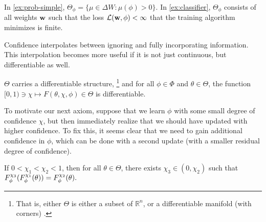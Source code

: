 In \cref{ex:prob-simple}, $\Theta_\phi = \{ \mu \in \Delta W : \mu(\phi) > 0\}$.
In \cref{ex:classifier}, $\Theta_\phi$ consists of all weights $\mathbf{w}$ 
such that
the loss $\mathcal L(\mathbf{w}, \phi) < \infty$ that the training algorithm minimizes is finite.



Confidence interpolates between ignoring and fully incorporating 
information. This interpolation becomes more useful
if it is not just continuous, but differentiable as well.

\begin{CFaxioms}
	\item \label{ax:diffble}
	$\Theta$
	carries a differentiable structure,
	\unskip\footnote{
		That is, either 
		$\Theta$ is either a subset of $\mathbb R^n$,
	 	or a differentiable manifold (with corners) 
		\parencite{lee2013smooth,joyce2009manifolds-w/corners}.}
	and for all $\phi \in \Phi$ and $\theta \in \Theta$, 
	the function $[0,1) \ni \chi \mapsto F(\theta,\chi,\phi) \in \Theta$
	is differentiable.
\end{CFaxioms}

To motivate our next axiom,
suppose that we learn $\phi$ with some small degree of confidence $\chi$,
but then immediately realize that we should have updated with higher confidence. 
To fix this, it seems clear that we need to gain additional confidence
in $\phi$, which can be done with a second update 
(with a smaller residual degree of confidence).

\begin{CFaxioms}
	\item 
	If $0 < \chi_1 < \chi_2 < 1$, 
	then for all $\theta \in \Theta$, 
	there exists 
	$\chi_3 \in (0,\chi_2)$
	such that
	$
	F_\phi^{
	\chi_{3}
	}(F_\phi^{\chi_1}(\theta)) = F_\phi^{\chi_2}(\theta).
	$
	\label{ax:seq-for-more}
\end{CFaxioms}

